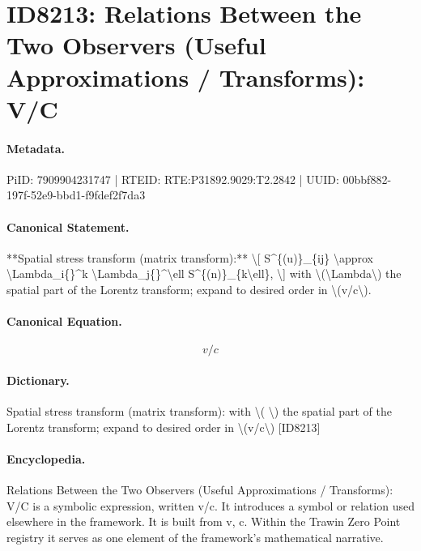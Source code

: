 \section*{ID8213: Relations Between the Two Observers (Useful Approximations / Transforms): V/C}
\paragraph{Metadata.}
PiID: 7909904231747 | RTEID: RTE:P31892.9029:T2.2842 | UUID: 00bbf882-197f-52e9-bbd1-f9fdef2f7da3

\paragraph{Canonical Statement.}
**Spatial stress transform (matrix transform):** \textbackslash{}[ S\textasciicircum{}\{(u)\}\_\{ij\} \textbackslash{}approx \textbackslash{}Lambda\_i\{\}\textasciicircum{}k \textbackslash{}Lambda\_j\{\}\textasciicircum{}\textbackslash{}ell S\textasciicircum{}\{(n)\}\_\{k\textbackslash{}ell\}, \textbackslash{}] with \textbackslash{}(\textbackslash{}Lambda\textbackslash{}) the spatial part of the Lorentz transform; expand to desired order in \textbackslash{}(v/c\textbackslash{}).

\paragraph{Canonical Equation.}
\[
v/c
\]

\paragraph{Dictionary.}
Spatial stress transform (matrix transform): with \textbackslash{}( \textbackslash{}) the spatial part of the Lorentz transform; expand to desired order in \textbackslash{}(v/c\textbackslash{}) [ID8213]

\paragraph{Encyclopedia.}
Relations Between the Two Observers (Useful Approximations / Transforms): V/C is a symbolic expression, written v/c. It introduces a symbol or relation used elsewhere in the framework. It is built from v, c. Within the Trawin Zero Point registry it serves as one element of the framework's mathematical narrative.
